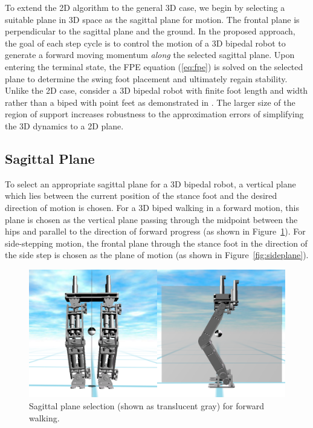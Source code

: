 To extend the 2D algorithm to the general 3D case, we begin by selecting a suitable plane in 3D space as the sagittal plane for motion. The frontal plane is perpendicular to the sagittal plane and the ground.  In the proposed approach, the goal of each step cycle is to control the motion of a 3D bipedal robot to generate a forward moving momentum \emph{along} the selected sagittal plane. Upon entering the terminal state, the FPE equation (\ref{eq:fpe}) is solved on the selected plane to determine the swing foot placement and ultimately regain stability. Unlike the 2D case, consider a 3D bipedal robot with finite foot length and width rather than a biped with point feet as demonstrated in \cite{Wight:2008vt}. The larger size of the region of support increases robustness to the approximation errors of simplifying the 3D dynamics to a 2D plane. 

\subsection{Sagittal Plane} %
\label{sub:sagittal_plane}
To select an appropriate sagittal plane for a 3D bipedal robot, a vertical plane which lies between the current position of the stance foot and the desired direction of motion is chosen. For a 3D biped walking in a forward motion, this plane is chosen as the vertical plane passing through the midpoint between the hips and parallel to the direction of forward progress (as shown in Figure~\ref{fig:forwardplane}). For side-stepping motion, the frontal plane through the stance foot in the direction of the side step is chosen as the plane of motion (as shown in Figure~\ref{fig:sideplane}). 

\begin{figure}[!b]
	\centering
    \includegraphics[scale=0.4]{fig/fpe/fpeplaneforwardwalk.png} 
  	\caption{Sagittal plane selection (shown as translucent gray) for forward walking.}
	\label{fig:forwardplane}
\end{figure}


